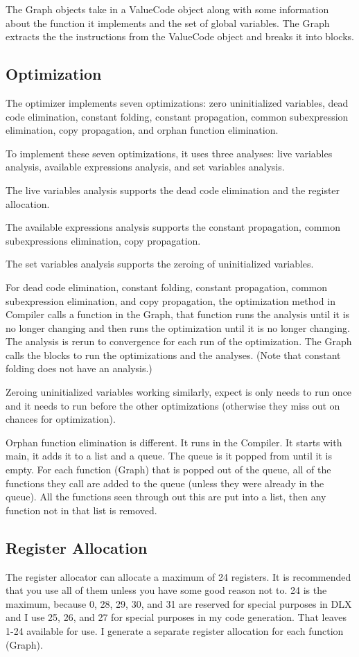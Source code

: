 The Graph objects take in a ValueCode object along with some information about the function it implements and the set of global variables. The Graph extracts the the instructions from the ValueCode object and breaks it into blocks. 

\subsection*{Optimization}
The optimizer implements seven optimizations: zero uninitialized variables, dead code elimination, constant folding, constant propagation, common subexpression elimination, copy propagation, and orphan function elimination. 

To implement these seven optimizations, it uses three analyses: live variables analysis, available expressions analysis, and set variables analysis. 

The live variables analysis supports the dead code elimination and the register allocation. 

The available expressions analysis supports the constant propagation, common subexpressions elimination, copy propagation. 

The set variables analysis supports the zeroing of uninitialized variables. 

For dead code elimination, constant folding, constant propagation, common subexpression elimination, and copy propagation, the optimization method in Compiler calls a function in the Graph, that function runs the analysis until it is no longer changing and then runs the optimization until it is no longer changing. The analysis is rerun to convergence for each run of the optimization. The Graph calls the blocks to run the optimizations and the analyses. (Note that constant folding does not have an analysis.)

Zeroing uninitialized variables working similarly, expect is only needs to run once and it needs to run before the other optimizations (otherwise they miss out on chances for optimization). 

Orphan function elimination is different. It runs in the Compiler. It starts with main, it adds it to a list and a queue. The queue is it popped from until it is empty. For each function (Graph) that is popped out of the queue, all of the functions they call are added to the queue (unless they were already in the queue). All the functions seen through out this are put into a list, then any function not in that list is removed. 

\subsection*{Register Allocation}
The register allocator can allocate a maximum of 24 registers. It is recommended that you use all of them unless you have some good reason not to. 24 is the maximum, because 0, 28, 29, 30, and 31 are reserved for special purposes in DLX and I use 25, 26, and 27 for special purposes in my code generation. That leaves 1-24 available for use. I generate a separate register allocation for each function (Graph). 

